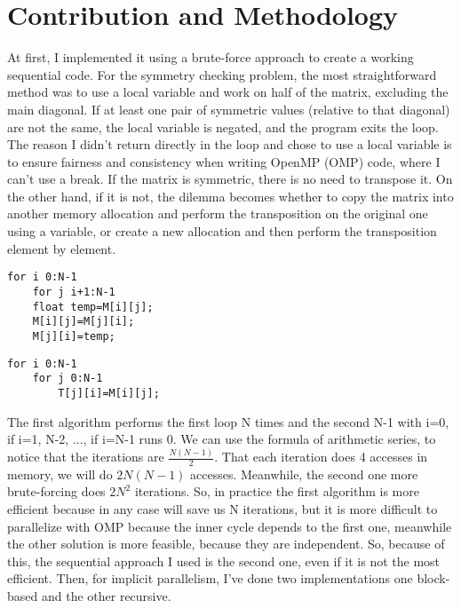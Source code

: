 \section{Contribution and Methodology}
At first, I implemented it using a brute-force approach to create a working sequential code. For the symmetry checking problem, the most straightforward method was to use a local variable and work on half of the matrix, excluding the main diagonal. If at least one pair of symmetric values (relative to that diagonal) are not the same, the local variable is negated, and the program exits the loop. The reason I didn't return directly in the loop and chose to use a local variable is to ensure fairness and consistency when writing OpenMP (OMP) code, where I can’t use a break. If the matrix is symmetric, there is no need to transpose it. On the other hand, if it is not, the dilemma becomes whether to copy the matrix into another memory allocation and perform the transposition on the original one using a variable, or create a new allocation and then perform the transposition element by element.\newline
\begin{minipage}[t]{0.5\columnwidth} 
\begin{lstlisting}[style=Cstyle, caption={Temporary}]
for i 0:N-1 
    for j i+1:N-1
    float temp=M[i][j];
    M[i][j]=M[j][i];
    M[j][i]=temp;
\end{lstlisting}
\end{minipage}\hfill
\begin{minipage}[t]{0.5\columnwidth}
\begin{lstlisting}[style=Cstyle, caption={General}]
for i 0:N-1 
    for j 0:N-1 
        T[j][i]=M[i][j];
\end{lstlisting}
\end{minipage}
The first algorithm performs the first loop N times and the second N-1 with i=0, if i=1, N-2, ..., if i=N-1 runs 0. We can use the formula of arithmetic series\cite{arithmetic_series}, to notice that the iterations are $\frac{N(N-1)}{2}$.
That each iteration does 4 accesses in memory, we will do $2N(N-1)$ accesses. Meanwhile, the second one more brute-forcing does $2N^2$ iterations. So, in practice the first algorithm is more efficient because in any case will save us N iterations, but it is more difficult to parallelize with OMP because the inner cycle depends to the first one, meanwhile the other solution is more feasible, because they are independent. So, because of this, the sequential approach I used is the second one, even if it is not the most efficient. Then, for implicit parallelism, I’ve done two implementations one block-based and the other recursive.
